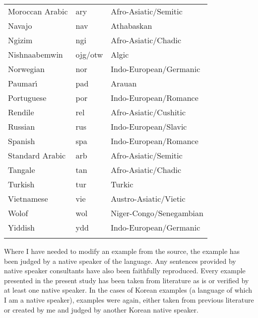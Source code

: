 \begin{table}[h]
\begin{tabular*}{.9\textwidth}{lll}
Moroccan Arabic & ary & Afro-Asiatic/Semitic \\ 
Navajo & nav & Athabaskan \\ 
Ngizim & ngi & Afro-Asiatic/Chadic \\ 
Nishnaabemwin & ojg/otw & Algic \\ 
Norwegian & nor & Indo-European/Germanic \\ 
Paumar{\'{\i}} & pad & Arauan \\ 
Portuguese & por & Indo-European/Romance \\ 
Rendile & rel & Afro-Asiatic/Cushitic \\ 
Russian & rus & Indo-European/Slavic \\ 
Spanish & spa & Indo-European/Romance \\ 
Standard Arabic & arb & Afro-Asiatic/Semitic \\ 
Tangale & tan & Afro-Asiatic/Chadic \\ 
Turkish & tur & Turkic \\ 
Vietnamese & vie & Austro-Asiatic/Vietic \\ 
Wolof & wol & Niger-Congo/Senegambian \\ 
Yiddish & ydd & Indo-European/Germanic \\ 
\lspbottomrule
\end{tabular*}
\end{table}


Where I have needed to modify an example from the source, the example
has been judged by a native speaker of the language.  Any sentences
provided by native speaker consultants have also been faithfully
reproduced.  Every example presented in the present study has been
taken from literature as is or verified by at least one native
speaker. In the cases of Korean examples (a language of which I am a
native speaker), examples were again, either taken from previous
literature or created by me and judged by another Korean native
speaker.


